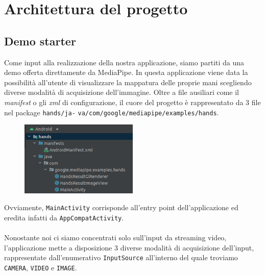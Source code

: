 \chapter{Architettura del progetto}

\section{Demo starter}
Come input alla realizzazione della nostra applicazione, siamo partiti da una demo offerta direttamente da MediaPipe. In questa applicazione viene data la possibilità all'utente di visualizzare la mappatura delle proprie mani scegliendo diverse modalità di acquisizione dell'immagine.
Oltre a file ausiliari come il \textit{manifest} o gli \textit{xml} di configurazione, il cuore del progetto è rappresentato da 3 file nel package \texttt{hands/ja-} \texttt{va/com/google/mediapipe/examples/hands}.
\begin{figure}[H]
    \centering
    \includegraphics[width=0.5\textwidth]{images/struct_demo.png}
\end{figure}
\noindent Ovviamente, \texttt{MainActivity} corrisponde all'entry point dell'applicazione ed eredita infatti da \texttt{AppCompatActivity}.\\
\\
\noindent Nonostante noi ci siamo concentrati solo sull'input da streaming video, l'applicazione mette a disposizione 3 diverse modalità di acquisizione dell'input, rappresentate dall'enumerativo \texttt{InputSource} all'interno del quale troviamo \texttt{CAMERA}, \texttt{VIDEO} e \texttt{IMAGE}.\\


